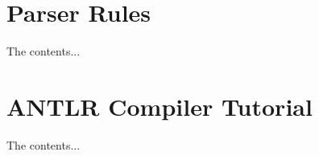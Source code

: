 \appendix
\chapter{Parser Rules}
The contents...

\chapter{ANTLR Compiler Tutorial }
The contents...

